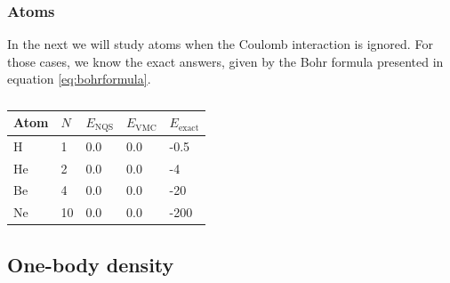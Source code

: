 \subsubsection{Atoms}
In the next we will study atoms when the Coulomb interaction is ignored. For those cases, we know the exact answers, given by the Bohr formula presented in equation \eqref{eq:bohrformula}.
\begin{table} [H]
	\caption{ }
	\begin{tabularx}{\textwidth}{X|X|X:X:X} \hline\hline
		\label{tab:nointeractionatoms}
		Atom & $N$ & $E_{\text{NQS}}$ & $E_{\text{VMC}}$ & $E_{\text{exact}}$ \\ \hline
		H & 1 & 0.0 & 0.0 & -0.5 \\ 
		He & 2 & 0.0 & 0.0 & -4 \\
		Be & 4 & 0.0 & 0.0 & -20 \\
		Ne & 10 & 0.0 & 0.0 & -200 \\ \hline\hline
	\end{tabularx}
\end{table}


\subsection{One-body density}


